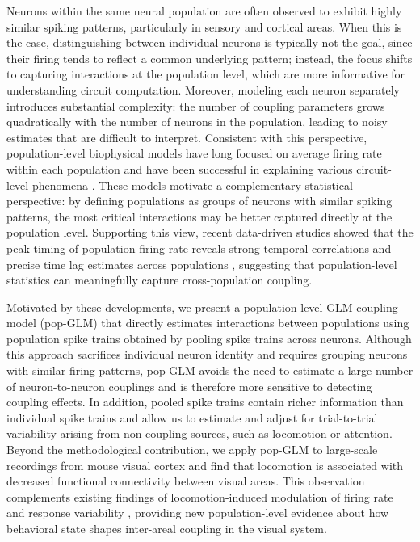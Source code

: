 \documentclass[12pt]{article}
\begin{document}
Neurons within the same neural population are often observed to exhibit highly similar spiking patterns, particularly in sensory and cortical areas. When this is the case, distinguishing between individual neurons is typically not the goal, since their firing tends to reflect a common underlying pattern; instead, the focus shifts to capturing interactions at the population level, which are more informative for understanding circuit computation. Moreover, modeling each neuron separately introduces substantial complexity: the number of coupling parameters grows quadratically with the number of neurons in the population, leading to noisy estimates that are difficult to interpret. Consistent with this perspective, population-level biophysical models have long focused on average firing rate within each population and have been successful in explaining various circuit-level phenomena \cite{gerstner2014neuronal, wilson1972excitatory, wilson1973mathematical, joglekar2018inter}. These models motivate a complementary statistical perspective: by defining populations as groups of neurons with similar spiking patterns, the most critical interactions may be better captured directly at the population level. Supporting this view, recent data-driven studies showed that the peak timing of population firing rate reveals strong temporal correlations and precise time lag estimates across populations \cite{chen2022population, olarinre2025relative}, suggesting that population-level statistics can meaningfully capture cross-population coupling.

Motivated by these developments, we present a population-level GLM coupling model (pop-GLM) that directly estimates interactions between populations using population spike trains obtained by pooling spike trains across neurons. Although this approach sacrifices individual neuron identity and requires grouping neurons with similar firing patterns, pop-GLM avoids the need to estimate a large number of neuron-to-neuron couplings and is therefore more sensitive to detecting coupling effects. In addition, pooled spike trains contain richer information than individual spike trains and allow us to estimate and adjust for trial-to-trial variability arising from non-coupling sources, such as locomotion or attention. Beyond the methodological contribution, we apply pop-GLM to large-scale recordings from mouse visual cortex and find that locomotion is associated with decreased functional connectivity between visual areas. This observation complements existing findings of locomotion-induced modulation of firing rate and response variability \cite{niell2010modulation, keller2012sensorimotor, lecoq2014visualizing, andermann2011functional, ayaz2013locomotion, bennett2013subthreshold, polack2013cellular, fu2014VIP, vinck2015arousal, dadarlat2017locomotion, pillow2022reduced, glickfeld2017higher}, providing new population-level evidence about how behavioral state shapes inter-areal coupling in the visual system.
\end{document}
